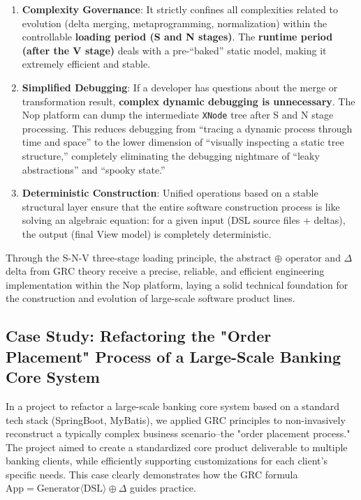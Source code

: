 \documentclass[11pt]{article}
\begin{document}
\begin{enumerate}
\item \textbf{Complexity Governance}: It strictly confines all complexities related to evolution (delta merging, metaprogramming, normalization) within the controllable \textbf{loading period (S and N stages)}. The \textbf{runtime period (after the V stage)} deals with a pre-``baked'' static model, making it extremely efficient and stable.
\item \textbf{Simplified Debugging}: If a developer has questions about the merge or transformation result, \textbf{complex dynamic debugging is unnecessary}. The Nop platform can dump the intermediate \texttt{XNode} tree after S and N stage processing. This reduces debugging from ``tracing a dynamic process through time and space'' to the lower dimension of ``visually inspecting a static tree structure,'' completely eliminating the debugging nightmare of ``leaky abstractions'' and ``spooky state.''
\item \textbf{Deterministic Construction}: Unified operations based on a stable structural layer ensure that the entire software construction process is like solving an algebraic equation: for a given input (DSL source files + deltas), the output (final View model) is completely deterministic.
\end{enumerate}

Through the S-N-V three-stage loading principle, the abstract $\oplus$ operator and $\Delta$ delta from GRC theory receive a precise, reliable, and efficient engineering implementation within the Nop platform, laying a solid technical foundation for the construction and evolution of large-scale software product lines.

\subsection{Case Study: Refactoring the "Order Placement" Process of a Large-Scale Banking Core System}

In a project to refactor a large-scale banking core system based on a standard tech stack (SpringBoot, MyBatis), we applied GRC principles to non-invasively reconstruct a typically complex business scenario--the "order placement process." The project aimed to create a standardized core product deliverable to multiple banking clients, while efficiently supporting customizations for each client's specific needs. This case clearly demonstrates how the GRC formula $\text{App} = \text{Generator}\langle\text{DSL}\rangle \oplus \Delta$ guides practice.
\end{document}

